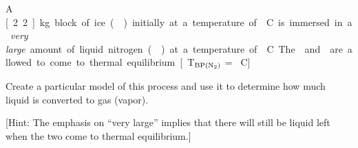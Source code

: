 \label{fnt1.2.1-6}

A \unit[2.2]{kg} block of ice () initially at a temperature of \unit[-20]{\textdegree C} is immersed in a \emph{very large} amount of liquid nitrogen () at a temperature of \unit[-196]{\textdegree C}. The  and  are allowed to come to thermal equilibrium.  [T$_\text{BP(\ce{N2})}$ = \unit[-196]{\textdegree C}]

Create a particular model of this process and use it to determine how much liquid  is converted to gas (vapor).

[Hint: The emphasis on ``very large'' implies that there will still be liquid  left when the two come to thermal equilibrium.]